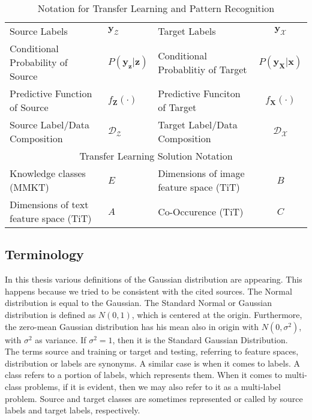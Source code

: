 \begin{table}[]
{\begin{tabular}{@{}lclc@{}}
		Source Labels                          & \multicolumn{1}{l|}{$\mathbf{y}_\mathcal{Z}$}      & Target Labels                                         & $\mathbf{y}_\mathcal{X}$      \\
		Conditional Probability of Source      & \multicolumn{1}{l|}{$P(\mathbf{y}_\mathbf{z}\vert\mathbf{z})$} & Conditional Probablitiy of Target                     & $P(\mathbf{y}_\mathbf{X}\vert\mathbf{x})$ \\
		Predictive Function of Source          & \multicolumn{1}{l|}{$f_\mathbf{Z}(\cdot)$}    & Predictive Funciton of Target                         & $f_\mathbf{X}(\cdot)$    \\
		Source Label/Data Composition          & \multicolumn{1}{l|}{$\mathcal{D_Z}$}      & Target Label/Data Composition                         & $\mathcal{D_X}$        \\ \midrule
		\multicolumn{4}{c}{Transfer Learning Solution Notation}                                                                                 \\ \midrule
		Knowledge classes (MMKT)               & \multicolumn{1}{l|}{$E$}       & Dimensions of image feature space (TiT)               & $B$       \\
		Dimensions of text feature space (TiT) & \multicolumn{1}{l|}{$A$}       & Co-Occurence (TiT)                                    & $C$       \\ \bottomrule
	\end{tabular}}
	\caption{Notation for Transfer Learning and Pattern Recognition\label{ATableNotation}}

\end{table}
\subsection{Terminology}
In this thesis various definitions of the Gaussian distribution are appearing.
This happens because we tried to be consistent with the cited sources.
The Normal distribution is equal to the Gaussian.
The Standard Normal or Gaussian distribution is defined as $N(0,1)$, which is centered at the origin.
Furthermore, the zero-mean Gaussian distribution has his mean also in origin with $N(0,\sigma^2)$, with $\sigma^2$ as variance.
If $\sigma^2=1$, then it is the Standard Gaussian Distribution.\\
The terms source and training or target and testing, referring to feature spaces, distribution or labels are synonyms.
A similar case is when it comes to labels. A class refers to a portion of labels, which represents them. 
When it comes to multi-class problems, if it is evident, then we may also refer to it as a multi-label problem.
Source and target classes are sometimes represented or called by source labels and target labels, respectively.
\clearpage
\newpage
